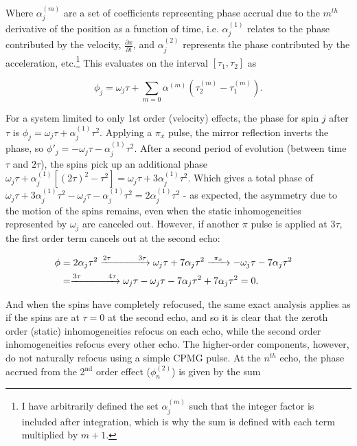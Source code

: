 \documentclass[PaulGanssle-Thesis.tex]{subfiles}
\begin{document}
Where $\alpha_{j}^{(m)}$ are a set of coefficients representing phase accrual due to the $m^{th}$ derivative of the position as a function of time, i.e. $\alpha_{j}^{(1)}$ relates to the phase contributed by the velocity, $\tfrac{\partial x}{\partial t}$, and $\alpha_{j}^{(2)}$ represents the phase contributed by the acceleration, etc.\footnote{I have arbitrarily defined the set $\alpha_{j}^{(m)}$ such that the integer factor is included after integration, which is why the sum is defined with each term multiplied by $m+1$.} This evaluates on the interval $[\tau_{1}, \tau_{2}]$ as

\begin{equation}
\phi_{j} = \omega_{j}\tau + \sum_{m=0}\alpha^{(m)}\left(\tau_{2}^{(m)}-\tau_{1}^{(m)}\right).
\label{eqn:PhaseAccrualMovementTauEval}
\end{equation}

For a system limited to only 1st order (velocity) effects, the phase for spin $j$ after $\tau$ is $\phi_{j} = \omega_{j}\tau + \alpha_{j}^{(1)}\tau^2$. Applying a $\pi_{x}$ pulse, the mirror reflection inverts the phase, so $\phi'_{j} = -\omega_{j}\tau - \alpha_{j}^{(1)}\tau^2$. After a second period of evolution (between time $\tau$ and $2\tau$), the spins pick up an additional phase $\omega_{j}\tau + \alpha_{j}^{(1)}\left[(2\tau)^2-\tau^2\right] = \omega_{j}\tau + 3\alpha_{j}^{(1)}\tau^2$. Which gives a total phase of $\omega_{j}\tau + 3\alpha_{j}^{(1)}\tau^2 - \omega_{j}\tau - \alpha_{j}^{(1)}\tau^2 = 2\alpha_{j}^{(1)}\tau^{2}$ - as expected, the asymmetry due to the motion of the spins remains, even when the static inhomogeneities represented by $\omega_{j}$ are canceled out. However, if another $\pi$ pulse is applied at $3\tau$, the first order term cancels out at the second echo:

\begin{align}
\phi & = 2\alpha_{j}\tau^2 \xrightarrow{2\tau\hspace*{1cm}3\tau} \omega_{j}\tau + 7\alpha_{j}\tau^2 \xrightarrow{\hspace*{1.5mm}\pi_{x}\hspace*{1.5mm}} -\omega_{j}\tau - 7\alpha_{j}\tau^2 & \nonumber \\ 
 & = \xrightarrow{3\tau\hspace*{1cm}4\tau} \omega_{j}\tau - \omega_{j}\tau -7\alpha_{j}\tau^2 + 7\alpha_{j}\tau^2 = 0. &
\label{eqn:PhaseCancellation4tau}
\end{align} 

And when the spins have completely refocused, the same exact analysis applies as if the spins are at $\tau = 0$ at the second echo, and so it is clear that the zeroth order (static) inhomogeneities refocus on each echo, while the second order inhomogeneities refocus every other echo. The higher-order components, however, do not naturally refocus using a simple CPMG pulse. At the $n^{th}$ echo, the phase accrued from the 2$^{\mathrm{nd}}$ order effect ($\phi_{n}^{(2)}$) is given by the sum
\end{document}
